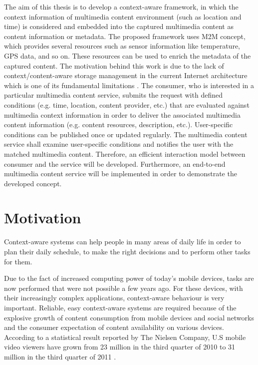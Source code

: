 The aim of this thesis is to develop a context-aware framework, in which the context information of multimedia content environment (such as location and time) is considered and embedded into the captured multimedia content as content information or metadata. The proposed framework uses \ac{M2M} concept, which provides several resources such as sensor information like temperature, \ac{GPS} data, and so on. These resources can be used to enrich the metadata of the captured content. The motivation behind this work is due to the lack of context/content-aware storage management in the current Internet architecture which is one of its fundamental limitations \cite{ec1}. The consumer, who is interested in a particular multimedia content service, submits the request with defined conditions (e.g. time, location, content provider, etc.) that are evaluated against multimedia context information in order to deliver the associated multimedia content information (e.g. content resources, description, etc.). User-specific conditions can be published once or updated regularly. The multimedia content service shall examine user-specific conditions and notifies the user with the matched multimedia content. Therefore, an efficient interaction model between consumer and the service will be developed. Furthermore, an end-to-end multimedia content service will be implemented in order to demonstrate the developed concept.

\section{Motivation\label{sec:moti}}

Context-aware systems can help people in many areas of daily life in order to plan their daily schedule, to make the right decisions  and to perform other tasks for them.

Due to the fact of increased computing power of today's mobile devices, tasks are now performed that were not possible a few years ago. For these devices, with their increasingly complex applications, context-aware behaviour is very important. Reliable, easy context-aware systems are required because of the explosive growth of content consumption from mobile devices and social networks and the consumer expectation of content availability on various devices. According to a statistical result reported by The Nielsen Company, U.S mobile video viewers have grown from 23 million in the third quarter of 2010 to 31 million in the third quarter of 2011 \cite{mobile-media-report}.

